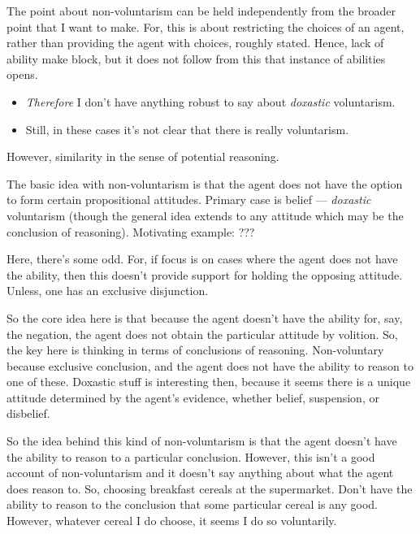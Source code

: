 \documentclass[10pt]{article}
\begin{document}
\begin{note}
  The point about non-voluntarism can be held independently from the broader point that I want to make.
  For, this is about restricting the choices of an agent, rather than providing the agent with choices, roughly stated.
  Hence, lack of ability make block, but it does not follow from this that instance of abilities opens.

  \begin{itemize}
  \item \emph{Therefore} I don't have anything robust to say about \emph{doxastic} voluntarism.
  \item Still, in these cases it's not clear that there is really voluntarism.
  \end{itemize}

  However, similarity in the sense of potential reasoning.
\end{note}

\begin{note}
  The basic idea with non-voluntarism is that the agent does not have the option to form certain propositional attitudes.
  Primary case is belief --- \emph{doxastic} voluntarism (though the general idea extends to any attitude which may be the conclusion of reasoning).
  Motivating example: ???
\end{note}

\begin{note}
  Here, there's some odd.
  For, if focus is on cases where the agent does not have the ability, then this doesn't provide support for holding the opposing attitude.
  Unless, one has an exclusive disjunction.

  So the core idea here is that because the agent doesn't have the ability for, say, the negation, the agent does not obtain the particular attitude by volition.
  So, the key here is thinking in terms of conclusions of reasoning.
  Non-voluntary because exclusive conclusion, and the agent does not have the ability to reason to one of these.
  Doxastic stuff is interesting then, because it seems there is a unique attitude determined by the agent's evidence, whether belief, suspension, or disbelief.
\end{note}

\begin{note}[Hum]
  So the idea behind this kind of non-voluntarism is that the agent doesn't have the ability to reason to a particular conclusion.
  However, this isn't a good account of non-voluntarism and it doesn't say anything about what the agent does reason to.
  So, choosing breakfast cereals at the supermarket.
  Don't have the ability to reason to the conclusion that some particular cereal is any good.
  However, whatever cereal I do choose, it seems I do so voluntarily.
\end{note}
\end{document}
